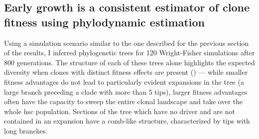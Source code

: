 \begin{figure}[h]
	\label{fig:heatmap-ks-d}
\end{figure}

\subsection{Early growth is a consistent estimator of clone fitness using phylodynamic estimation}

Using a simulation scenario similar to the one described for the previous section of the results, I inferred phylogenetic trees for 120 Wright-Fisher simulations after 800 generations. The structure of each of these trees alone highlights the expected diversity when clones with distinct fitness effects are present () --- while smaller fitness advantages do not lead to particularly evident expansions in the tree (a large branch preceding a clade with more than 5 tips), larger fitness advantages often have the capacity to sweep the entire clonal landscape and take over the whole \ac{hsc} population. Sections of the tree which have no driver and are not contained in an expansion have a comb-like structure, characterized by tips with long branches.

\begin{figure}[h]
	\label{fig:trees-simulated-examples}
\end{figure}

